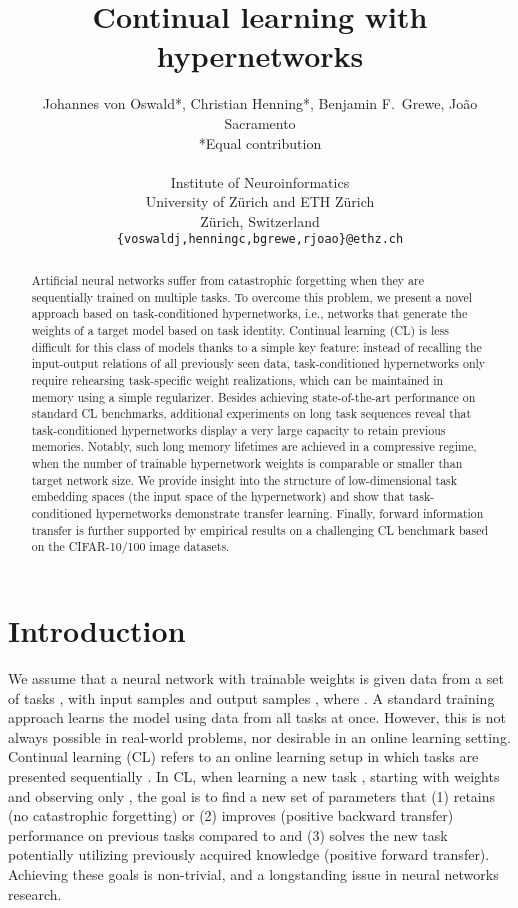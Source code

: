 \documentclass{article}
\title{Continual learning with hypernetworks}
\author{Johannes von Oswald*, Christian Henning*, Benjamin F.~Grewe, João Sacramento \\
  *Equal contribution\\
  \\
  Institute of Neuroinformatics\\
  University of Zürich and ETH Zürich\\
  Zürich, Switzerland\\
  \texttt{\{voswaldj,henningc,bgrewe,rjoao\}@ethz.ch}  
}
\begin{document}
\maketitle
\begin{abstract}

Artificial neural networks suffer from catastrophic forgetting when they are sequentially trained on multiple tasks. To overcome this problem, we present a novel approach based on task-conditioned hypernetworks, i.e., networks that generate the weights of a target model based on task identity. Continual learning (CL) is less difficult for this class of models thanks to a simple key feature: instead of recalling the input-output relations of all previously seen data, task-conditioned hypernetworks only require rehearsing task-specific weight realizations, which can be maintained in memory using a simple regularizer. Besides achieving state-of-the-art performance on standard CL benchmarks, additional experiments on long task sequences reveal that task-conditioned hypernetworks display a very large capacity to retain previous memories. Notably, such long memory lifetimes are achieved in a compressive regime, when the number of trainable hypernetwork weights is comparable or smaller than target network size.
We provide insight into the structure of low-dimensional task embedding spaces (the input space of the hypernetwork) and show that task-conditioned hypernetworks demonstrate transfer learning. Finally, forward information transfer is further supported by empirical results on a challenging CL benchmark based on the CIFAR-10/100 image datasets.
\end{abstract}

\section{Introduction}
\label{sec:intro}
We assume that a neural network  with trainable weights  is given data from a set of tasks , with input samples  and output samples , where . A standard training approach learns the model using data from all tasks at once. However, this is not always possible in real-world problems, nor desirable in an online learning setting. Continual learning (CL) refers to an online learning setup in which tasks are presented sequentially \citep[see][for a recent review on CL]{van_de_ven_three_2019}. In CL, when learning a new task , starting with weights  and observing only , the goal is to find a new set of parameters  that (1) retains (no catastrophic forgetting) or (2) improves (positive backward transfer) performance on previous tasks compared to  and (3) solves the new task  potentially utilizing previously acquired knowledge (positive forward transfer). Achieving these goals is non-trivial, and a longstanding issue in neural networks research.
\end{document}
